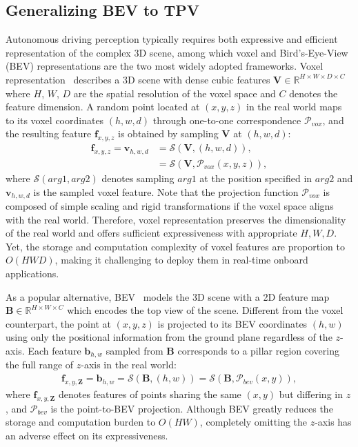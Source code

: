 \documentclass[10pt,twocolumn,letterpaper]{article}
\begin{document}
\subsection{Generalizing BEV to TPV}
Autonomous driving perception typically requires both expressive and efficient representation of the complex 3D scene, among which voxel and Bird's-Eye-View (BEV) representations are the two most widely adopted frameworks.
Voxel representation~\cite{drinet++,spvnas,uvtr} describes a 3D scene with dense cubic features $\mathbf{V}\in\mathbb{R}^{H\times W\times D\times C}$ where $H$, $W$, $D$ are the spatial resolution of the voxel space and $C$ denotes the feature dimension.
A random point located at $(x, y, z)$ in the real world maps to its voxel coordinates $(h, w, d)$ through one-to-one correspondence $\mathcal{P}_{vox}$, and the resulting feature $\mathbf{f}_{x,y,z}$ is obtained by sampling $\mathbf{V}$ at $(h, w, d)$:
\begin{equation}\label{eqn: BEV proj}
\begin{aligned}
    \mathbf{f}_{x,y,z}=\mathbf{v}_{h,w,d}&=\mathcal{S}(\mathbf{V}, (h,w,d)), \\
    &=\mathcal{S}(\mathbf{V}, \mathcal{P}_{vox}(x,y,z)),
\end{aligned}
\end{equation}
where $\mathcal{S}(arg1, arg2)$ denotes sampling $arg1$ at the position specified in $arg2$ and $\mathbf{v}_{h,w,d}$ is the sampled voxel feature.
Note that the projection function $\mathcal{P}_{vox}$ is composed of simple scaling and rigid transformations if the voxel space aligns with the real world.
Therefore, voxel representation preserves the dimensionality of the real world and offers sufficient expressiveness with appropriate $H,W,D$.
Yet, the storage and computation complexity of voxel features are proportion to $O(HWD)$, making it challenging to deploy them in real-time onboard applications.

As a popular alternative, BEV~\cite{polarformer,bevformer,bevdepth,bevfusion} models the 3D scene with a 2D feature map $\mathbf{B}\in\mathbb{R}^{H\times W\times C}$ which encodes the top view of the scene.
Different from the voxel counterpart, the point at $(x, y, z)$ is projected to its BEV coordinates $(h, w)$ using only the positional information from the ground plane regardless of the $z$-axis.
Each feature $\mathbf{b}_{h, w}$ sampled from $\mathbf{B}$ corresponds to a pillar region covering the full range of $z$-axis in the real world:
\begin{equation}
    \begin{aligned}
        \mathbf{f}_{x,y,\mathbf{Z}}=\mathbf{b}_{h,w}=\mathcal{S}(\mathbf{B}, (h,w))=\mathcal{S}(\mathbf{B}, \mathcal{P}_{bev}(x,y)),
    \end{aligned}
\end{equation}
where $\mathbf{f}_{x,y,\mathbf{Z}}$ denotes features of points sharing the same $(x,y)$ but differing in $z$, and $\mathcal{P}_{bev}$ is the point-to-BEV projection.
Although BEV greatly reduces the storage and computation burden to $O(HW)$, completely omitting the $z$-axis has an adverse effect on its expressiveness. 
\end{document}
